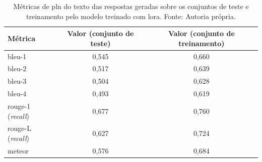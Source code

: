 \begin{table}[ht]
    \centering
    \begin{tabular}{l|c|c}
        \hline
        Métrica                        & Valor (conjunto de teste) & Valor (conjunto de treinamento) \\ \hline
        \ac{bleu}-1                    & 0,545                     & 0,660                           \\
        \ac{bleu}-2                    & 0,517                     & 0,639                           \\
        \ac{bleu}-3                    & 0,504                     & 0,628                           \\
        \ac{bleu}-4                    & 0,493                     & 0,619                           \\
        \hline
        \ac{rouge}-1 (\textit{recall}) & 0,677                     & 0,760                           \\
        \ac{rouge}-L (\textit{recall}) & 0,627                     & 0,724                           \\
        \hline
        \ac{meteor}                    & 0,576                     & 0,684                           \\
        \hline
    \end{tabular}
    \label{tab:lladerm_lora_nlp_metrics}
    \caption{Métricas de \ac{pln} do texto das respostas geradas sobre os conjuntos de teste e treinamento pelo
    modelo treinado com \ac{lora}. Fonte: Autoria própria.}
\end{table}

